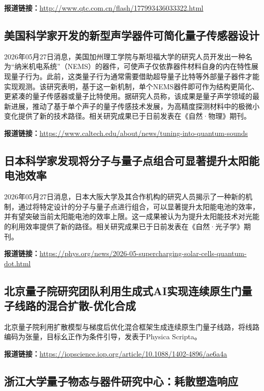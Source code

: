 \documentclass[12pt,a4paper]{ctexart}
\begin{document}
\noindent\textbf{报道链接：}\url{http://www.qtc.com.cn/flash/177993436033322.html}

\subsection{ 美国科学家开发的新型声学器件可简化量子传感器设计 }

2026年05月27日消息，美国加州理工学院与斯坦福大学的研究人员开发出一种名为“纳米机电系统”（NEMS）的器件，可使声子仅依靠器件材料自身的内在特性展现量子行为。此前，这类量子行为通常需要借助超导量子比特等外部量子器件才能实现观测。该研究表明，基于这一新机制，单个NEMS器件即可作为结构更简化、更紧凑的量子传感器或量子比特使用。据研究人员称，该成果是量子声学领域的最新进展，推动了基于单个声子的量子传感技术发展，为高精度探测材料中的极微小变化提供了新的技术路径。相关研究成果已于日前发表在《自然·物理》期刊。

\noindent\textbf{报道链接：}\url{https://www.caltech.edu/about/news/tuning-into-quantum-sounds}

\subsection{ 日本科学家发现将分子与量子点组合可显著提升太阳能电池效率 }

2026年05月27日消息，日本大阪大学及其合作机构的研究人员揭示了一种新的机制，通过将特定设计的分子与量子点进行组合，可以显著提升太阳能电池的效率，并有望突破当前太阳能电池的效率上限。这一成果被认为为提升太阳能技术对光能的利用效率提供了新的路径。相关研究成果已于日前发表在《自然·光子学》期刊。

\noindent\textbf{报道链接：}\url{https://phys.org/news/2026-05-supercharging-solar-cells-quantum-dot.html}

\subsection{ 北京量子院研究团队利用生成式AI实现连续原生门量子线路的混合扩散-优化合成 }

北京量子院利用扩散模型与梯度后优化混合框架生成连续原生门量子线路，将线路编码为张量，目标幺正作为条件引导，发表于Physica Scripta。

\noindent\textbf{报道链接：}\url{https://iopscience.iop.org/article/10.1088/1402-4896/ae6a4a}

\subsection{ 浙江大学量子物态与器件研究中心：耗散塑造响应 }
\end{document}
